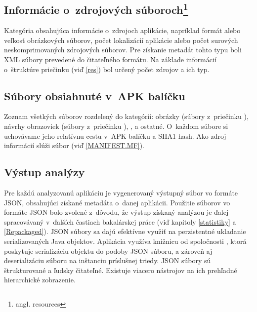 \subsection*{Informácie o~zdrojových súboroch\footnote{angl. resources}} 
Kategória obsahujúca informácie o~zdrojoch aplikácie, napríklad formát alebo veľkosť obrázkových súborov, počet lokalizácií aplikácie alebo počet surových neskomprimovaných zdrojových súborov. Pre získanie metadát tohto typu boli XML súbory prevedené do čitateľného formátu. Na základe informácií o~štruktúre priečinku  (viď \ref{res}) bol určený počet zdrojov a ich typ.
\subsection*{Súbory obsiahnuté v~APK balíčku}
Zoznam všetkých súborov rozdelený do kategórií: obrázky (súbory z~priečinku ), návrhy obrazoviek (súbory z~priečinku ), ,  a ostatné. O~každom súbore si uchovávame jeho relatívnu cestu v~APK balíčku a SHA1 hash. Ako zdroj informácií slúži súbor  (viď \ref{MANIFEST.MF}).


\subsection{Výstup analýzy}
Pre každú analyzovanú aplikáciu je vygenerovaný výstupný súbor vo formáte JSON, obsahujúci získané metadáta o~danej aplikácii. Použitie súborov vo formáte JSON bolo zvolené z~dôvodu, že výstup získaný analýzou je ďalej spracovávaný v~ďalších častiach bakalárskej práce (viď kapitoly \ref{statistiky} a \ref{Repackaged}). JSON súbory sa dajú efektívne využiť na perzistentné ukladanie serializovaných Java objektov. Aplikácia  využíva knižnicu  od spoločnosti , ktorá poskytuje serializáciu objektu do podoby JSON súboru, a zároveň aj deserializáciu súboru na inštanciu príslušnej triedy. JSON súbory sú štrukturované a ľudsky čitateľné. Existuje viacero nástrojov na ich prehľadné hierarchické zobrazenie.  